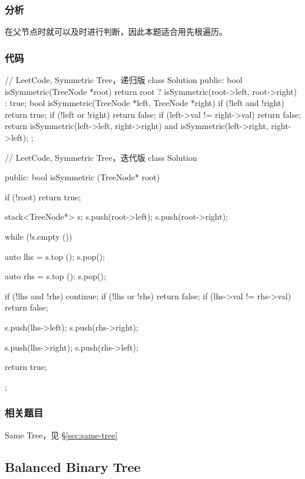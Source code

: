 \subsubsection{分析}
在父节点时就可以及时进行判断，因此本题适合用先根遍历。


\subsubsection{代码}

\begin{Code}
// LeetCode, Symmetric Tree，递归版
class Solution {
public:
    bool isSymmetric(TreeNode *root) {
        return root ? isSymmetric(root->left, root->right) : true;
    }
    bool isSymmetric(TreeNode *left, TreeNode *right) {
        if (!left and !right) return true;
        if (!left or !right) return false;
        if (left->val != right->val) return false;
        return isSymmetric(left->left, right->right)
                and isSymmetric(left->right, right->left);
    }
};
\end{Code}

\begin{Code}
// LeetCode, Symmetric Tree，迭代版
class Solution {
public:
    bool isSymmetric (TreeNode* root) {
        if (!root) return true;

        stack<TreeNode*> s;
        s.push(root->left);
        s.push(root->right);

        while (!s.empty ()) {
            auto lhs = s.top ();
            s.pop();

            auto rhs = s.top ();
            s.pop();

            if (!lhs and !rhs) continue;
            if (!lhs or !rhs) return false;
            if (lhs->val != rhs->val) return false;

            s.push(lhs->left);
            s.push(rhs->right);

            s.push(lhs->right);
            s.push(rhs->left);
        }

        return true;
    }
};
\end{Code}


\subsubsection{相关题目}
\begindot
\item Same Tree，见 \S \ref{sec:same-tree}
\myenddot


\subsection{Balanced Binary Tree}
\label{sec:balanced-binary-tree}


